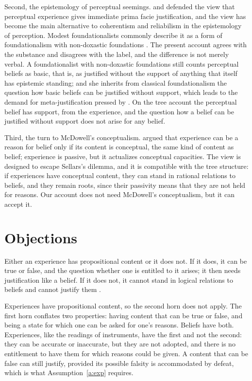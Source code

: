 \documentclass{situationist-preprint}
\begin{document}
Second, the epistemology of perceptual seemings. \citet{Pryor2000} and \citet{Huemer2001} defended the view that perceptual experience gives immediate prima facie justification, and the view has become the main alternative to coherentism and reliabilism in the epistemology of perception. Modest foundationalists commonly describe it as a form of foundationalism with non-doxastic foundations \citep{Audi1993}. The present account agrees with the substance and disagrees with the label, and the difference is not merely verbal. A foundationalist with non-doxastic foundations still counts perceptual beliefs as basic, that is, as justified without the support of anything that itself has epistemic standing; and she inherits from classical foundationalism the question how basic beliefs can be justified without support, which leads to the demand for meta-justification pressed by \citet{BonJour1978}. On the tree account the perceptual belief has support, from the experience, and the question how a belief can be justified without support does not arise for any belief.

Third, the turn to McDowell's conceptualism. \citet{McDowell1994} argued that experience can be a reason for belief only if its content is conceptual, the same kind of content as belief; experience is passive, but it actualizes conceptual capacities. The view is designed to escape Sellars's dilemma, and it is compatible with the tree structure: if experiences have conceptual content, they can stand in rational relations to beliefs, and they remain roots, since their passivity means that they are not held for reasons. Our account does not need McDowell's conceptualism, but it can accept it.

\section{Objections}\label{s:objections}

\begin{objection}
Either an experience has propositional content or it does not. If it does, it can be true or false, and the question whether one is entitled to it arises; it then needs justification like a belief. If it does not, it cannot stand in logical relations to beliefs and cannot justify them \citep{Sellars1956}.
\end{objection}

\begin{reply}
Experiences have propositional content, so the second horn does not apply. The first horn conflates two properties: having content that can be true or false, and being a state for which one can be asked for one's reasons. Beliefs have both. Experiences, like the readings of instruments, have the first and not the second: they can be accurate or inaccurate, but they are not adopted, and there is no entitlement to have them for which reasons could be given. A content that can be false can still justify, provided its possible falsity is accommodated by defeat, which is what Assumption~\ref{a:exp} requires.
\end{reply}
\end{document}
